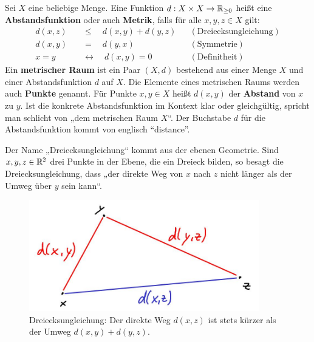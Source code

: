 \begin{de}[* Abstandsfunktion] \label{def:abstand}    
    Sei $X$ eine beliebige Menge. Eine Funktion $d:X\times X\to \mathbb R_{\ge 0}$ heißt eine \textbf{Abstandsfunktion} oder auch \textbf{Metrik}, falls für alle $x,y,z\in X$ gilt:
    \begin{align*}
        d(x,z) \quad&\le\quad d(x,y)+d(y,z) && (\text{Dreiecksungleichung}) \\
        d(x,y) \quad&=\quad d(y,x) && (\text{Symmetrie}) \\
        x=y \quad&\leftrightarrow\quad d(x,y)=0 && (\text{Definitheit})
    \end{align*}
    Ein \textbf{metrischer Raum} ist ein Paar $(X,d)$ bestehend aus einer Menge $X$ und einer Abstandsfunktion $d$ auf $X$. Die Elemente eines metrischen Raums werden auch \textbf{Punkte} genannt. Für Punkte $x,y\in X$ heißt $d(x,y)$ der \textbf{Abstand} von $x$ zu $y$. Ist die konkrete Abstandsfunktion im Kontext klar oder gleichgültig, spricht man schlicht von „dem metrischen Raum $X$“. Der Buchstabe $d$ für die Abstandsfunktion kommt von englisch ``distance''. 
\end{de}


\begin{bem}
    Der Name „Dreiecksungleichung“ kommt aus der ebenen Geometrie. Sind $x,y,z\in \mathbb R^2$ drei Punkte in der Ebene, die ein Dreieck bilden, so besagt die Dreiecksungleichung, dass „der direkte Weg von $x$ nach $z$ nicht länger als der Umweg über $y$ sein kann“.
    \begin{figure}[ht]
        \includegraphics[width=10cm]{./_img/Dreiecksungleichung.jpeg}
        \centering \caption{Dreiecksungleichung: Der direkte Weg $d(x,z)$ ist stets kürzer als der Umweg $d(x,y)+d(y,z)$.}
    \end{figure}
\end{bem}


